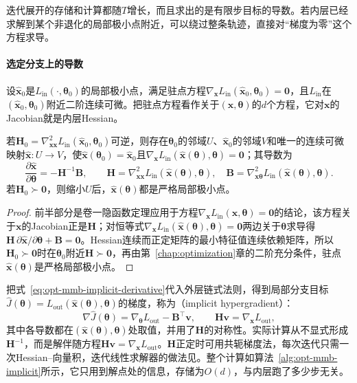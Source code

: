 迭代展开的存储和计算都随$T$增长，而且求出的是有限步目标的导数。若内层已经求解到某个非退化的局部极小点附近，可以绕过整条轨迹，直接对“梯度为零”这个方程求导。

\paragraph{选定分支上的导数}
设$\hat{\bm x}_0$是$L_{\mathrm{in}}(\cdot,\bm\theta_0)$的局部极小点，满足驻点方程$\nabla_{\bm x}L_{\mathrm{in}}(\hat{\bm x}_0,\bm\theta_0)=\bm 0$，且$L_{\mathrm{in}}$在$(\hat{\bm x}_0,\bm\theta_0)$附近二阶连续可微。把驻点方程看作关于$(\bm x,\bm\theta)$的$d$个方程，它对$\bm x$的Jacobian就是内层Hessian。

\begin{theorem}[解分支的可微性]
\label{thm:opt-mmb-implicit-branch}
若$\bm H_0=\nabla^2_{\bm x\bm x}L_{\mathrm{in}}(\hat{\bm x}_0,\bm\theta_0)$可逆，则存在$\bm\theta_0$的邻域$U$、$\hat{\bm x}_0$的邻域$V$和唯一的连续可微映射$\hat{\bm x}:U\to V$，使$\hat{\bm x}(\bm\theta_0)=\hat{\bm x}_0$且$\nabla_{\bm x}L_{\mathrm{in}}(\hat{\bm x}(\bm\theta),\bm\theta)=\bm 0$；其导数为
\begin{equation}
\label{eq:opt-mmb-implicit-derivative}
\frac{\partial\hat{\bm x}}{\partial\bm\theta}=-\bm H^{-1}\bm B,\qquad
\bm H=\nabla^2_{\bm x\bm x}L_{\mathrm{in}}(\hat{\bm x}(\bm\theta),\bm\theta),\quad
\bm B=\nabla^2_{\bm x\bm\theta}L_{\mathrm{in}}(\hat{\bm x}(\bm\theta),\bm\theta).
\end{equation}
若$\bm H_0\succ\bm 0$，则缩小$U$后，$\hat{\bm x}(\bm\theta)$都是严格局部极小点。
\end{theorem}

\begin{proof}
前半部分是卷一隐函数定理应用于方程$\nabla_{\bm x}L_{\mathrm{in}}(\bm x,\bm\theta)=\bm 0$的结论，该方程关于$\bm x$的Jacobian正是$\bm H$；对恒等式$\nabla_{\bm x}L_{\mathrm{in}}(\hat{\bm x}(\bm\theta),\bm\theta)=\bm 0$两边关于$\bm\theta$求导得$\bm H\,\partial\hat{\bm x}/\partial\bm\theta+\bm B=\bm 0$。Hessian连续而正定矩阵的最小特征值连续依赖矩阵，所以$\bm H_0\succ\bm 0$时在$\bm\theta_0$附近$\bm H\succ\bm 0$，再由第~\ref{chap:optimization}章的二阶充分条件，驻点$\hat{\bm x}(\bm\theta)$是严格局部极小点。
\end{proof}

把式~\eqref{eq:opt-mmb-implicit-derivative}代入外层链式法则，得到局部分支目标$\widehat J(\bm\theta)=L_{\mathrm{out}}(\hat{\bm x}(\bm\theta),\bm\theta)$的梯度，称为（implicit hypergradient）：
\begin{equation}
\label{eq:opt-mmb-implicit-hypergradient}
\nabla\widehat J(\bm\theta)=\nabla_{\bm\theta}L_{\mathrm{out}}-\bm B^\top\bm v,\qquad
\bm H\bm v=\nabla_{\bm x}L_{\mathrm{out}},
\end{equation}
其中各导数都在$(\hat{\bm x}(\bm\theta),\bm\theta)$处取值，并用了$\bm H$的对称性。实际计算从不显式形成$\bm H^{-1}$，而是解伴随方程$\bm H\bm v=\nabla_{\bm x}L_{\mathrm{out}}$。$\bm H$正定时可用共轭梯度法，每次迭代只需一次Hessian--向量积，迭代线性求解器的做法见。整个计算如算法~\ref{alg:opt-mmb-implicit}所示，它只用到解点处的信息，存储为$O(d)$，与内层跑了多少步无关。


